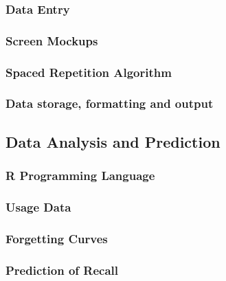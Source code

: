 \subsubsection{Data Entry}
\subsubsection{Screen Mockups}
\subsubsection{Spaced Repetition Algorithm}
\subsubsection{Data storage, formatting and output}

\subsection{Data Analysis and Prediction}
\subsubsection{R Programming Language}
\subsubsection{Usage Data}
\subsubsection{Forgetting Curves}
\subsubsection{Prediction of Recall}